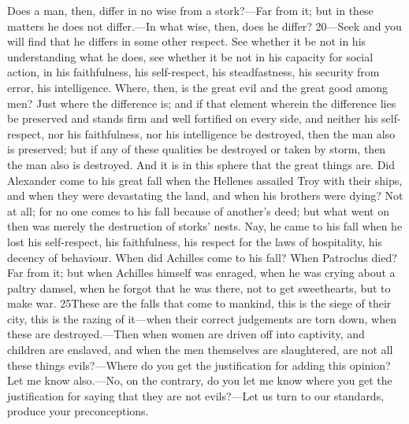 Does a man, then, differ in no wise from a stork?—Far from it; but in these matters he does not differ.—In what wise, then, does he differ? 20—Seek and you will find that he differs in some other respect. See whether it be not in his understanding what he does, see whether it be not in his capacity for social action, in his faithfulness, his self-respect, his steadfastness, his security from error, his intelligence. Where, then, is the great evil and the great good among men? Just where the difference is; and if that element wherein the difference lies be preserved and stands firm and well fortified on every side, and neither his self-respect, nor his faithfulness, nor his intelligence be destroyed, then the man also is preserved; but if any of these qualities be destroyed or taken by storm, then the man also is destroyed. And it is in this sphere that the great things are. Did Alexander come to his great fall when the Hellenes assailed Troy with their ships, and when they were devastating the land, and when his brothers were dying? Not at all; for no one comes to his fall because of another's deed; but what went on then was merely the destruction of storks' nests. Nay, he came to his fall when he lost his self-respect, his faithfulness, his respect for the laws of hospitality, his decency of behaviour. When did Achilles come to his fall? When Patroclus died? Far from it; but when Achilles himself was enraged, when he was crying about a paltry damsel, when he forgot that he was there, not to get sweethearts, but to make war. 25These are the falls that come to mankind, this is the siege of their city, this is the razing of it—when their correct judgements are torn down, when these are destroyed.—Then when women are driven off into captivity, and children are enslaved, and when the men themselves are slaughtered, are not all these things evils?—Where do you get the justification for adding this opinion? Let me know also.—No, on the contrary, do you let me know where you get the justification for saying that they are not evils?—Let us turn to our standards, produce your preconceptions.

